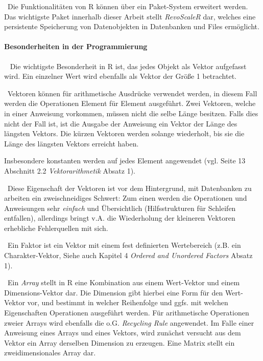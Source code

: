 ~\newline Die Funktionalitäten von R können über ein Paket-System erweitert werden. Das wichtigste Paket innerhalb dieser Arbeit stellt \textit{RevoScaleR} dar, welches eine persistente Speicherung von Datenobjekten in Datenbanken und Files ermöglicht. 

\paragraph{Besonderheiten in der Programmierung}~\newline
Die wichtigste Besonderheit in R ist, das jedes Objekt als Vektor aufgefasst wird. Ein einzelner Wert wird ebenfalls als Vektor der Größe 1 betrachtet.

~\newline Vektoren können für arithmetische Ausdrücke verwendet werden, in diesem Fall werden die Operationen Element für Element ausgeführt. Zwei Vektoren, welche in einer Anweisung vorkommen, müssen nicht die selbe Länge besitzen. Falls dies nicht der Fall ist, ist die Ausgabe der Anweisung ein Vektor der Länge des längsten Vektors. Die kürzen Vektoren werden solange wiederholt, bis sie die Länge des längsten Vektors erreicht haben.

Insbesondere konstanten werden auf jedes Element angewendet (vgl. \cite{RIntro} Seite 13 Abschnitt 2.2 \textit{Vektorarithmetik} Absatz 1).

~\newline Diese Eigenschaft der Vektoren ist vor dem Hintergrund, mit Datenbanken zu arbeiten ein zweischneidiges Schwert: Zum einen werden die Operationen und Anweisungen sehr \textit{einfach} und Übersichtlich (Hilfsstrukturen für Schleifen entfallen), allerdings bringt v.A. die Wiederholung der kleineren Vektoren erhebliche Fehlerquellen mit sich. 

~\newline Ein Faktor ist ein Vektor mit einem fest definierten Wertebereich (z.B. ein Charakter-Vektor, Siehe auch \cite{RIntro} Kapitel 4 \textit{Ordered and Unordered Factors} Absatz 1).

~\newline Ein \textit{Array} stellt in R eine Kombination aus einem Wert-Vektor und einem Dimensions-Vektor dar. Die Dimension gibt hierbei eine Form für den Wert-Vektor vor, und bestimmt in welcher Reihenfolge und ggfs. mit welchen Eigenschaften Operationen ausgeführt werden. Für arithmetische Operationen zweier Arrays wird ebenfalls die o.G. \textit{Recycling Rule} angewendet. Im Falle einer Anweisung eines Arrays und eines Vektors, wird zunächst versucht aus dem Vektor ein Array derselben Dimension zu erzeugen. Eine Matrix stellt ein zweidimensionales Array dar. 

